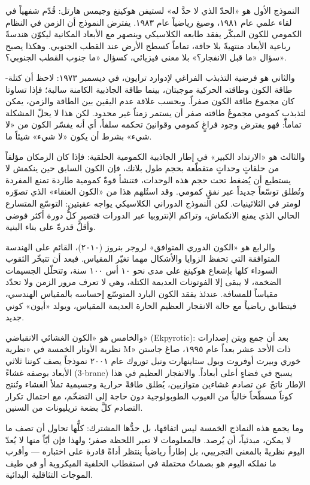 \documentclass[12pt,a4paper,openany]{book}
\begin{document}
النموذج الأول هو «الحدّ الذي لا حدَّ له» لستيفن هوكينغ وجيمس هارتل: قُدّم شفهياً في لقاء علمي عام ١٩٨١، وصيغ رياضياً عام ١٩٨٣. يفترض النموذج أن الزمن في النظام الكمومي للكون المبكّر يفقد طابعه الكلاسيكي وينصهر مع الأبعاد المكانية ليكوّن هندسةً رباعية الأبعاد منتهيةً بلا حافة، تماماً كسطح الأرض عند القطب الجنوبي. وهكذا يصبح سؤال «ما قبل الانفجار؟» بلا معنى فيزيائي، كسؤال «ما جنوب القطب الجنوبي؟».


والثاني هو فرضية التذبذب الفراغي لإدوارد ترايون، في ديسمبر ١٩٧٣: لاحظ أن كتلة-طاقة الكون وطاقته الحركية موجبتان، بينما طاقة الجاذبية الكامنة سالبة؛ فإذا تساوتا كان مجموع طاقة الكون صفراً. وبحسب علاقة عدم اليقين بين الطاقة والزمن، يمكن لتذبذبٍ كمومي مجموعُ طاقته صفر أن يستمر زمناً غير محدود. لكن هذا لا يحلّ المشكلة تماماً: فهو يفترض وجود فراغٍ كمومي وقوانينَ تحكمه سلفاً، أي أنه يفسّر الكون من «لا شيء» بشرط أن يكون «لا شيء» شيئاً ما.


والثالث هو «الارتداد الكبير» في إطار الجاذبية الكمومية الحلقية: فإذا كان الزمكان مؤلفاً من حلقاتٍ وحداتٍ متقطّعة بحجم طول بلانك، فإن الكون السابق حين ينكمش لا يستطيع أن يُضغط تحت حجم هذه الوحدات، فتنشأ قوةٌ كمومية طاردة تمنع المفردة وتُطلق توسّعاً جديداً عبر نفقٍ كمومي. وقد استُلهم هذا من «الكون العنقاء» الذي تصوّره لومتر في الثلاثينيات. لكن النموذج الدوراني الكلاسيكي يواجه عقبتين: التوسّع المتسارع الحالي الذي يمنع الانكماش، وتراكم الإنتروبيا عبر الدورات فتصير كلُّ دورة أكثر فوضى وأقلَّ قدرةً على بناء البنية.


والرابع هو «الكون الدوري المتوافق» لروجر بنروز (٢٠١٠)، القائم على الهندسة المتوافقة التي تحفظ الزوايا والأشكال مهما تغيّر المقياس. فبعد أن تتبخّر الثقوب السوداء كلها بإشعاع هوكينغ على مدى نحو ١٠ أس ١٠٠ سنة، وتتحلّل الجسيمات الضخمة، لا يبقى إلا الفوتونات العديمة الكتلة، وهي لا تعرف مرور الزمن ولا تحدّد مقياساً للمسافة. عندئذ يفقد الكون البارد المتوسّع إحساسه بالمقياس الهندسي، فيتطابق رياضياً مع حالة الانفجار العظيم الحارة العديمة المقياس، ويولد «أيون» كوني جديد.


والخامس هو «الكون الغشائي الانقباضي» (Ekpyrotic): بعد أن جمع ويتن إصدارات نظرية الأوتار الخمسة في «نظرية M» ذات الأحد عشر بعداً عام ١٩٩٥، صاغ جاستن خوري وبيرت أوفروت وبول ستاينهارت ونيل توروك عام ٢٠٠١ نموذجاً يصف كوننا ثلاثي الأبعاد بوصفه غشاءً (3-brane) يسبح في فضاءٍ أعلى أبعاداً. والانفجار العظيم في هذا الإطار ناتجٌ عن تصادم غشاءين متوازيين، يُطلق طاقةً حرارية وجسيمية تملأ الغشاء وتُنتج كوناً مسطّحاً خالياً من العيوب الطوبولوجية دون حاجة إلى التضخّم، مع احتمال تكرار التصادم كلَّ بضعة تريليونات من السنين.


وما يجمع هذه النماذج الخمسة ليس اتفاقها، بل حدُّها المشترك: كلُّها تحاول أن تصف ما لا يمكن، مبدئياً، أن يُرصد. فالمعلومات لا تعبر اللحظة صفر؛ ولهذا فإن أيّاً منها لا يُعدّ اليوم نظريةً بالمعنى التجريبي، بل إطاراً رياضياً ينتظر أداةً قادرة على اختباره — وأقرب ما نملكه اليوم هو بصماتٌ محتملة في استقطاب الخلفية الميكروية أو في طيف الموجات التثاقلية البدائية.
\end{document}
